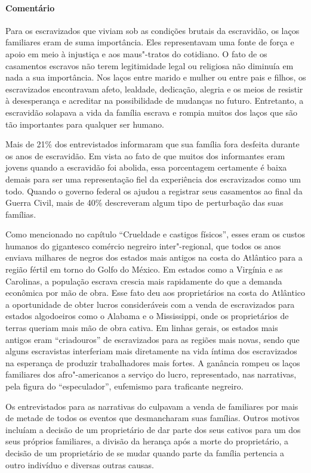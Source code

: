 \paragraph{Comentário}\quad
{\small
Para os escravizados que viviam sob as condições brutais da
escravidão, os laços familiares eram de suma importância. Eles
representavam uma fonte de força e apoio em meio à injustiça e aos
maus"-tratos do cotidiano. O fato de os casamentos escravos não terem
legitimidade legal ou religiosa não diminuía em nada a sua importância.
Nos laços entre marido e mulher ou entre pais e filhos, os escravizados
encontravam afeto, lealdade, dedicação, alegria e os meios de resistir à
desesperança e acreditar na possibilidade de mudanças no futuro.
Entretanto, a escravidão solapava a vida da família escrava e rompia
muitos dos laços que são tão importantes para qualquer ser humano.

Mais de 21\% dos entrevistados informaram que sua
família fora desfeita durante os anos de escravidão. Em vista ao fato de
que muitos dos informantes eram jovens quando a escravidão foi abolida,
essa porcentagem certamente é baixa demais para ser uma representação
fiel da experiência dos escravizados como um todo. Quando o governo federal
os ajudou a registrar seus casamentos ao final da Guerra Civil,
mais de 40\% descreveram algum tipo de perturbação das suas famílias. 

Como mencionado no capítulo ``Crueldade e castigos físicos'', esses eram os custos humanos do gigantesco comércio negreiro inter"-regional, que todos os anos
enviava milhares de negros dos estados mais antigos na costa do
Atlântico para a região fértil em torno do Golfo do México. Em estados
como a Virgínia e as Carolinas, a população escrava crescia mais
rapidamente do que a demanda econômica por mão de obra. Esse
fato deu aos proprietários na costa do Atlântico a oportunidade de obter
lucros consideráveis com a venda de escravizados para estados algodoeiros
como o Alabama e o Mississippi, onde os proprietários de terras queriam
mais mão de obra cativa. Em linhas gerais, os estados mais antigos eram
``criadouros'' de escravizados para as regiões mais novas, sendo que alguns
escravistas interferiam mais diretamente na vida íntima dos escravizados na
esperança de produzir trabalhadores mais fortes. A ganância rompeu os
laços familiares dos afro"-americanos a serviço do lucro, representado,
nas narrativas, pela figura do ``especulador'', eufemismo para
traficante negreiro.

Os entrevistados para as narrativas do  culpavam a
venda de familiares por mais de metade de todos os eventos que
desmancharam suas famílias. Outros motivos incluíam a decisão de um
proprietário de dar parte dos seus cativos para um dos seus próprios
familiares, a divisão da herança após a morte do proprietário, a decisão
de um proprietário de se mudar quando parte da família pertencia a outro
indivíduo e diversas outras causas.

}
